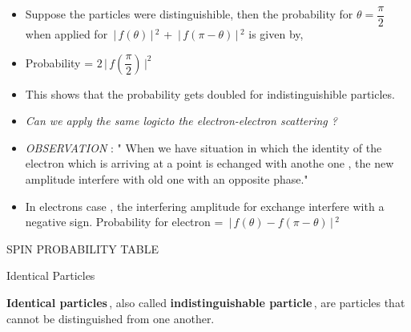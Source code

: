 \documentclass[aspectratio=169]{beamer}
\begin{document}
\begin{frame}{}

	\begin{itemize}

		\item Suppose the particles were distinguishible, then the probability for $\theta = \dfrac{\pi}{2}$ when applied for $ \,\Bigr\rvert\,f(\theta) \,\Bigr\rvert\,^{2} $ + $ \,\Bigr\rvert\,f(\pi - \theta) \,\Bigr\rvert\,^{2} $ is given by, \newline
		\item Probability = $2 \,\Bigr\rvert\, f\left(\dfrac{\pi}{2}\right) \,\Bigr\rvert ^{2}$ \newline 
		\item This shows that the probability gets doubled for indistinguishible particles.

	\end{itemize}
	
\end{frame}

\begin{frame}

	\begin{itemize}
	
		\item \textit{Can we apply the same logicto the electron-electron scattering ? }\newline
		\item \textit{OBSERVATION} : " When we have situation in which the identity of the electron which is arriving at a point is echanged with anothe one , the new amplitude interfere with old one with an opposite phase." \newline
		\item In electrons case , the interfering amplitude for exchange interfere with a negative sign. \newline
		Probability for electron = $\,\Bigr\rvert\,f(\theta)-f(\pi-\theta)\,\Bigr\rvert\,^{2}$
		
		 \end{itemize}
		 
\end{frame}

\begin{frame}

	SPIN PROBABILITY TABLE
	
\end{frame}

\begin{frame}{Identical Particles}
	
		{\large \textbf{Identical particles}\,, also called \textbf{indistinguishable particle}\,, are particles that cannot be distinguished from one another.}
		
\end{frame}
\end{document}
